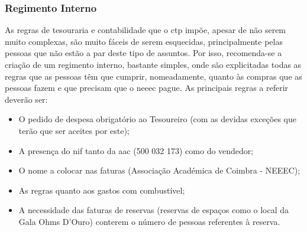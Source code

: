 
\subsubsection{Regimento Interno}

As regras de tesouraria e contabilidade que o \acrshort{ctp} impõe, apesar de não serem muito complexas, são muito fáceis de serem esquecidas, principalmente pelas pessoas que não estão a par deste tipo de assuntos. Por isso, recomenda-se a criação de um regimento interno, bastante simples, onde são explicitadas todas as regras que as pessoas têm que cumprir, nomeadamente, quanto às compras que as pessoas fazem e que precisam que o \acrshort{neeec} pague. As principais regras a referir deverão ser:
\begin{itemize}
    \item O pedido de despesa obrigatório ao Tesoureiro (com as devidas exceções que terão que ser aceites por este);
    \item A presença do \acrshort{nif} tanto da \acrshort{aac} (500 032 173) como do vendedor;
    \item O nome a colocar nas faturas (Associação Académica de Coimbra - NEEEC);
    \item As regras quanto aos gastos com combustível;
    \item A necessidade das faturas de reservas (reservas de espaços como o local da Gala Ohms D'Ouro) conterem o número de pessoas referentes à reserva.
\end{itemize}
